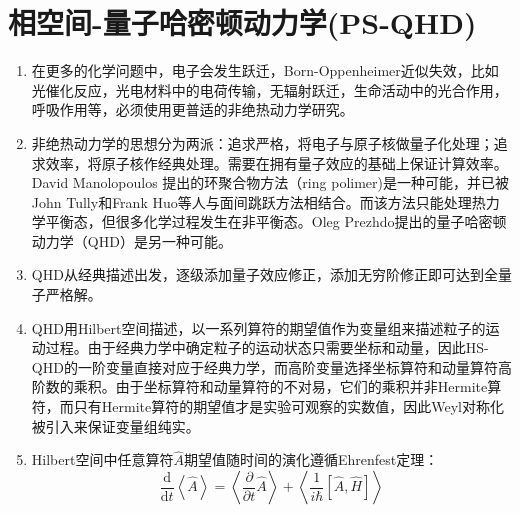 \documentclass[12pt,a4paper,openany,twoside]{book}
\numberwithin{equation}{section}
\newcommand{\mean}[1]{\left\langle #1 \right\rangle}
\newcommand{\ud}{\mathrm{d}}
\begin{document}
    \chapter{相空间-量子哈密顿动力学(PS-QHD)}
      \label{phase_space_dynamics}
      \begin{enumerate}
        \item 在更多的化学问题中，电子会发生跃迁，Born-Oppenheimer近似失效，比如光催化反应，光电材料中的电荷传输，无辐射跃迁，生命活动中的光合作用，呼吸作用等，必须使用更普适的非绝热动力学研究。

        \item 非绝热动力学的思想分为两派：追求严格，将电子与原子核做量子化处理；追求效率，将原子核作经典处理。需要在拥有量子效应的基础上保证计算效率。David Manolopoulos 提出的环聚合物方法（ring polimer)是一种可能，并已被John Tully和Frank Huo等人与面间跳跃方法相结合。而该方法只能处理热力学平衡态，但很多化学过程发生在非平衡态。Oleg Prezhdo提出的量子哈密顿动力学（QHD）是另一种可能。

        \item QHD从经典描述出发，逐级添加量子效应修正，添加无穷阶修正即可达到全量子严格解。

        \item QHD用Hilbert空间描述，以一系列算符的期望值作为变量组来描述粒子的运动过程。由于经典力学中确定粒子的运动状态只需要坐标和动量，因此HS-QHD的一阶变量直接对应于经典力学，而高阶变量选择坐标算符和动量算符高阶数的乘积。由于坐标算符和动量算符的不对易，它们的乘积并非Hermite算符，而只有Hermite算符的期望值才是实验可观察的实数值，因此Weyl对称化被引入来保证变量组纯实。

        \item Hilbert空间中任意算符$\hat{A}$期望值随时间的演化遵循Ehrenfest定理：
          \begin{equation}
            \frac{\ud}{\ud t}\mean{\hat{A}}=\mean{\frac{\partial}{\partial t} \hat{A}}+\mean{\frac{1}{i\hbar}\left[\hat{A},\hat{H}\right]}
          \end{equation}


\end{enumerate}
\end{document}
